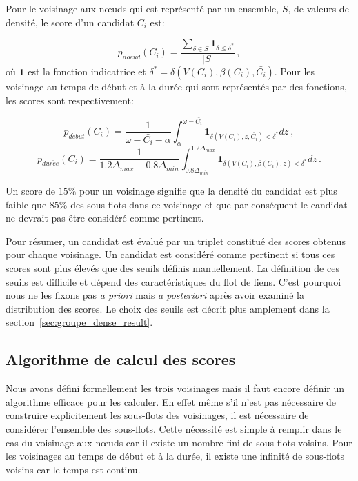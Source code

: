 Pour le voisinage aux n\oe{}uds qui est représenté par un ensemble, $S$, de valeurs de densité, le score d'un candidat $C_i$ est:

\begin{equation}
p_{noeud}(C_i)= \dfrac{\sum_{\delta \in S} \mathbf{1}_{\delta \le \delta^*}}{|S|}\,,
\end{equation}
où $\mathbf{1}$ est la fonction indicatrice et $\delta^* =\delta(V(C_i),\beta(C_i), \bar{C_i})$.
Pour les voisinage au temps de début et à la durée qui sont représentés par des fonctions, les scores sont respectivement:

\begin{equation}
p_{d\acute{e}but}(C_i)=\dfrac{1}{\omega-\bar{C_i} - \alpha} \int_{\alpha}^{\omega- \bar{C_i}} \mathbf{1}_{\delta(V(C_i),z,\bar{C_i}) <\delta^*} dz \ ,
\end{equation} 
\begin{equation}
p_{dur\acute{e}e}(C_i)=\dfrac{1}{1.2\Delta_{max} - 0.8\Delta_{min}} \int_{0.8\Delta_{min}}^{1.2\Delta_{max}} \mathbf{1}_{\delta(V(C_i),\beta(C_i),z) <\delta^*} dz \, .
\end{equation}

Un score de $15\%$ pour un voisinage signifie que la densité du candidat est plus faible que $85\%$ des sous-flots dans ce voisinage et que par conséquent le candidat ne devrait pas être considéré comme pertinent.

\bigskip
Pour résumer, un candidat est évalué par un triplet constitué des scores obtenus pour chaque voisinage.
Un candidat est considéré comme pertinent si tous ces scores sont plus élevés que des seuils définis manuellement.
La définition de ces seuils est difficile et dépend des caractéristiques du flot de liens.
C'est pourquoi nous ne les fixons pas \emph{a priori} mais \emph{a posteriori} après avoir examiné la distribution des scores.
Le choix des seuils est décrit plus amplement dans la section~\ref{sec:groupe_dense_result}.

\subsection{Algorithme de calcul des scores}
Nous avons défini formellement les trois voisinages mais il faut encore définir un algorithme efficace pour les calculer.
En effet même s'il n'est pas nécessaire de construire explicitement les sous-flots des voisinages, il est nécessaire de considérer l'ensemble des sous-flots.
Cette nécessité est simple à remplir dans le cas du voisinage aux n\oe{}uds car il existe un nombre fini de sous-flots voisins.
Pour les voisinages au temps de début et à la durée, il existe une infinité de sous-flots voisins car le temps est continu.


